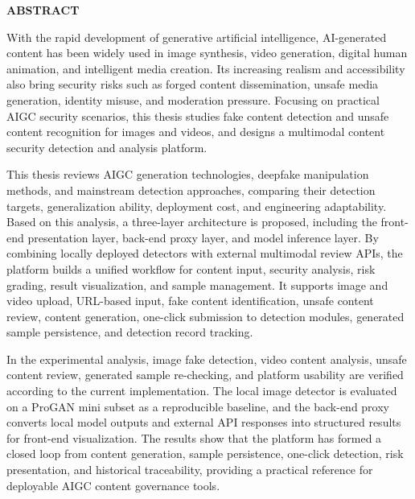 \begin{center}
  {\thesiswesternfont\fontsize{18pt}{27pt}\selectfont\bfseries ABSTRACT}
\end{center}

\vspace{1.5\baselineskip}

With the rapid development of generative artificial intelligence, AI-generated content has been widely used in image synthesis, video generation, digital human animation, and intelligent media creation. Its increasing realism and accessibility also bring security risks such as forged content dissemination, unsafe media generation, identity misuse, and moderation pressure. Focusing on practical AIGC security scenarios, this thesis studies fake content detection and unsafe content recognition for images and videos, and designs a multimodal content security detection and analysis platform.

This thesis reviews AIGC generation technologies, deepfake manipulation methods, and mainstream detection approaches, comparing their detection targets, generalization ability, deployment cost, and engineering adaptability. Based on this analysis, a three-layer architecture is proposed, including the front-end presentation layer, back-end proxy layer, and model inference layer. By combining locally deployed detectors with external multimodal review APIs, the platform builds a unified workflow for content input, security analysis, risk grading, result visualization, and sample management. It supports image and video upload, URL-based input, fake content identification, unsafe content review, content generation, one-click submission to detection modules, generated sample persistence, and detection record tracking.

In the experimental analysis, image fake detection, video content analysis, unsafe content review, generated sample re-checking, and platform usability are verified according to the current implementation. The local image detector is evaluated on a ProGAN mini subset as a reproducible baseline, and the back-end proxy converts local model outputs and external API responses into structured results for front-end visualization. The results show that the platform has formed a closed loop from content generation, sample persistence, one-click detection, risk presentation, and historical traceability, providing a practical reference for deployable AIGC content governance tools.

\vspace{1em}
